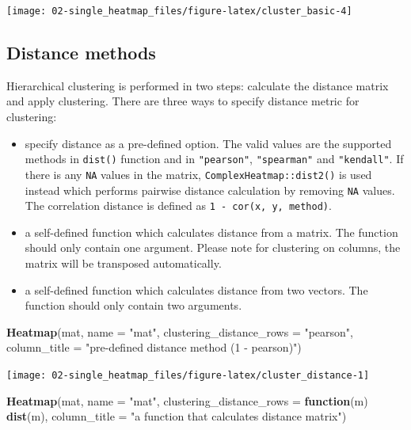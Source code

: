 \documentclass[]{book}
\newenvironment{Shaded}{\begin{snugshade}}{\end{snugshade}}
\newcommand{\KeywordTok}[1]{\textcolor[rgb]{0.13,0.29,0.53}{\textbf{#1}}}
\newcommand{\DataTypeTok}[1]{\textcolor[rgb]{0.13,0.29,0.53}{#1}}
\newcommand{\StringTok}[1]{\textcolor[rgb]{0.31,0.60,0.02}{#1}}
\newcommand{\ControlFlowTok}[1]{\textcolor[rgb]{0.13,0.29,0.53}{\textbf{#1}}}
\newcommand{\NormalTok}[1]{#1}
\providecommand{\tightlist}{%
  \setlength{\itemsep}{0pt}\setlength{\parskip}{0pt}}
\theoremstyle{definition}
\theoremstyle{definition}
\theoremstyle{definition}
\theoremstyle{remark}
\begin{document}
\begin{center}\texttt{[image: 02-single\_heatmap\_files/figure-latex/cluster\_basic-4]} \end{center}

\subsection{Distance methods}\label{distance-methods}

Hierarchical clustering is performed in two steps: calculate the
distance matrix and apply clustering. There are three ways to specify
distance metric for clustering:

\begin{itemize}
\tightlist
\item
  specify distance as a pre-defined option. The valid values are the
  supported methods in \texttt{dist()} function and in
  \texttt{"pearson"}, \texttt{"spearman"} and \texttt{"kendall"}. If
  there is any \texttt{NA} values in the matrix,
  \texttt{ComplexHeatmap::dist2()} is used instead which performs
  pairwise distance calculation by removing \texttt{NA} values. The
  correlation distance is defined as \texttt{1\ -\ cor(x,\ y,\ method)}.
\item
  a self-defined function which calculates distance from a matrix. The
  function should only contain one argument. Please note for clustering
  on columns, the matrix will be transposed automatically.
\item
  a self-defined function which calculates distance from two vectors.
  The function should only contain two arguments.
\end{itemize}

\begin{Shaded}
\begin{Highlighting}[]
\KeywordTok{Heatmap}\NormalTok{(mat, }\DataTypeTok{name =} \StringTok{"mat"}\NormalTok{, }\DataTypeTok{clustering_distance_rows =} \StringTok{"pearson"}\NormalTok{,}
    \DataTypeTok{column_title =} \StringTok{"pre-defined distance method (1 - pearson)"}\NormalTok{)}
\end{Highlighting}
\end{Shaded}

\begin{center}\texttt{[image: 02-single\_heatmap\_files/figure-latex/cluster\_distance-1]} \end{center}

\begin{Shaded}
\begin{Highlighting}[]
\KeywordTok{Heatmap}\NormalTok{(mat, }\DataTypeTok{name =} \StringTok{"mat"}\NormalTok{, }\DataTypeTok{clustering_distance_rows =} \ControlFlowTok{function}\NormalTok{(m) }\KeywordTok{dist}\NormalTok{(m),}
    \DataTypeTok{column_title =} \StringTok{"a function that calculates distance matrix"}\NormalTok{)}
\end{Highlighting}
\end{Shaded}
\end{document}
